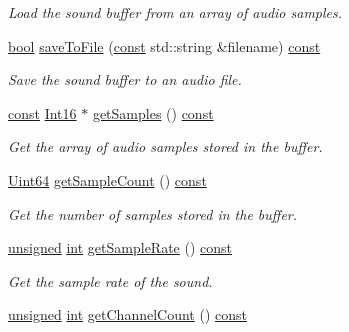\begin{DoxyCompactItemize}
\begin{DoxyCompactList}\small\item\em Load the sound buffer from an array of audio samples. \end{DoxyCompactList}\item 
\hyperlink{term__entry_8h_a002004ba5d663f149f6c38064926abac}{bool} \hyperlink{classsf_1_1_sound_buffer_ab2083dc1a934c64959d9e3f162328a76}{save\-To\-File} (\hyperlink{term__entry_8h_a57bd63ce7f9a353488880e3de6692d5a}{const} std\-::string \&filename) \hyperlink{term__entry_8h_a57bd63ce7f9a353488880e3de6692d5a}{const} 
\begin{DoxyCompactList}\small\item\em Save the sound buffer to an audio file. \end{DoxyCompactList}\item 
\hyperlink{term__entry_8h_a57bd63ce7f9a353488880e3de6692d5a}{const} \hyperlink{namespacesf_a3c8e10435e2a310a7741755e66b5c94e}{Int16} $\ast$ \hyperlink{classsf_1_1_sound_buffer_a4ba0c1e5b5be500af42de30b1360eb2e}{get\-Samples} () \hyperlink{term__entry_8h_a57bd63ce7f9a353488880e3de6692d5a}{const} 
\begin{DoxyCompactList}\small\item\em Get the array of audio samples stored in the buffer. \end{DoxyCompactList}\item 
\hyperlink{namespacesf_add9ac83466d96b9f50a009b9f4064266}{Uint64} \hyperlink{classsf_1_1_sound_buffer_a2a791e7304553fa96269cc355cc4f7e8}{get\-Sample\-Count} () \hyperlink{term__entry_8h_a57bd63ce7f9a353488880e3de6692d5a}{const} 
\begin{DoxyCompactList}\small\item\em Get the number of samples stored in the buffer. \end{DoxyCompactList}\item 
\hyperlink{curses_8priv_8h_aca40206900cfc164654362fa8d4ad1e6}{unsigned} \hyperlink{term__entry_8h_ad65b480f8c8270356b45a9890f6499ae}{int} \hyperlink{classsf_1_1_sound_buffer_a8cdfaea2ad1d05f81fa67442566c166e}{get\-Sample\-Rate} () \hyperlink{term__entry_8h_a57bd63ce7f9a353488880e3de6692d5a}{const} 
\begin{DoxyCompactList}\small\item\em Get the sample rate of the sound. \end{DoxyCompactList}\item 
\hyperlink{curses_8priv_8h_aca40206900cfc164654362fa8d4ad1e6}{unsigned} \hyperlink{term__entry_8h_ad65b480f8c8270356b45a9890f6499ae}{int} \hyperlink{classsf_1_1_sound_buffer_a0a2890747db3811fb8d969d3e3abd0d1}{get\-Channel\-Count} () \hyperlink{term__entry_8h_a57bd63ce7f9a353488880e3de6692d5a}{const} 

\end{DoxyCompactItemize}
